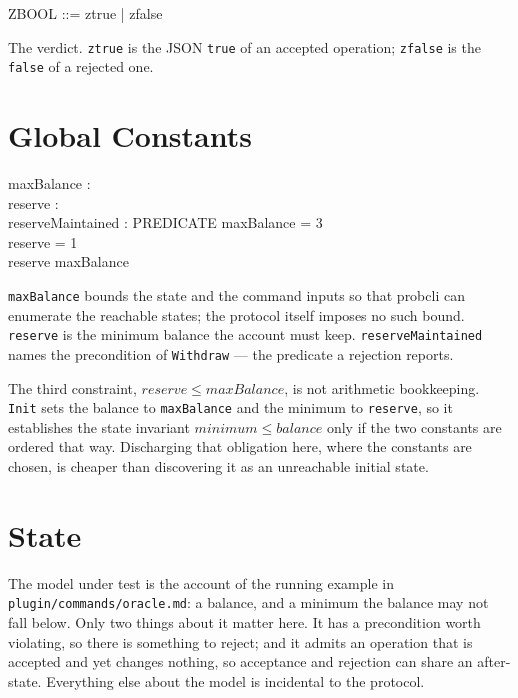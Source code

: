 \documentclass[a4paper,10pt,fleqn]{article}
\begin{document}
\begin{zed}
  ZBOOL ::= ztrue | zfalse
\end{zed}

The verdict. \texttt{ztrue} is the JSON \texttt{true} of an accepted
operation; \texttt{zfalse} is the \texttt{false} of a rejected one.

\section{Global Constants}

\begin{axdef}
  maxBalance : \nat \\
  reserve : \nat \\
  reserveMaintained : PREDICATE
  \where
  maxBalance = 3 \\
  reserve = 1 \\
  reserve \leq maxBalance
\end{axdef}

\texttt{maxBalance} bounds the state and the command inputs so that
probcli can enumerate the reachable states; the protocol itself imposes
no such bound. \texttt{reserve} is the minimum balance the account must
keep. \texttt{reserveMaintained} names the precondition of
\texttt{Withdraw} --- the predicate a rejection reports.

The third constraint, $reserve \leq maxBalance$, is not arithmetic
bookkeeping. \texttt{Init} sets the balance to \texttt{maxBalance} and
the minimum to \texttt{reserve}, so it establishes the state invariant
$minimum \leq balance$ only if the two constants are ordered that way.
Discharging that obligation here, where the constants are chosen, is
cheaper than discovering it as an unreachable initial state.

\section{State}

The model under test is the account of the running example in
\texttt{plugin/commands/oracle.md}: a balance, and a minimum the balance may not
fall below. Only two things about it matter here. It has a precondition
worth violating, so there is something to reject; and it admits an
operation that is accepted and yet changes nothing, so acceptance and
rejection can share an after-state. Everything else about the model is
incidental to the protocol.
\end{document}
